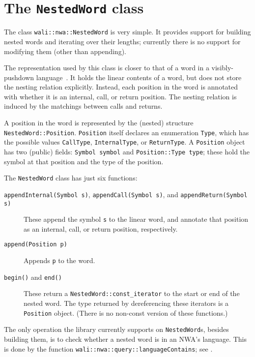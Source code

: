 \section{The \texttt{NestedWord} class}
\label{Se:class-nested-word}

The class \texttt{wali::nwa::NestedWord} is very simple. It provides support for
building nested words and iterating over their lengths; currently there
is no support for modifying them (other than appending).

The representation used by this class is closer to that of a word in a
visibly-pushdown language~\cite{JACM:AM2009}. It holds the linear contents of
a word, but does not store the nesting relation explicitly. Instead, each
position in the word is annotated with whether it is an internal, call, or
return position. The nesting relation is induced by the matchings between
calls and returns.

A position in the word is represented by the (nested) structure
\texttt{NestedWord::Position}. \texttt{Position} itself declares an
enumeration \texttt{Type}, which has the possible values \texttt{CallType},
\texttt{InternalType}, or \texttt{ReturnType}.
A \texttt{Position} object has two (public) fields: \texttt{Symbol symbol}
and \texttt{Position::Type type}; these hold the symbol at that position and
the type of the position.


The \texttt{NestedWord} class has just six functions:
\begin{description}
  \item[\texttt{appendInternal(Symbol s)}, \texttt{appendCall(Symbol s)}, and \texttt{appendReturn(Symbol s)}]
    These append the symbol \texttt{s} to the linear word, and annotate that
    position as an internal, call, or return position, respectively.
  \item[\texttt{append(Position p)}]
    Appends \texttt{p} to the word.
  \item[\texttt{begin()} and \texttt{end()}]
    These return a \texttt{NestedWord::const\_iterator} to the start or end
    of the nested word. The type returned by dereferencing these iterators is
    a \texttt{Position} object. (There is no non-const version of these
    functions.)
\end{description}

The only operation the library currently supports on
\texttt{NestedWord}s, besides building them, is to check whether a
nested word is in an NWA's language. This is done by the function
\texttt{wali::nwa::query::languageContains}; see
.


